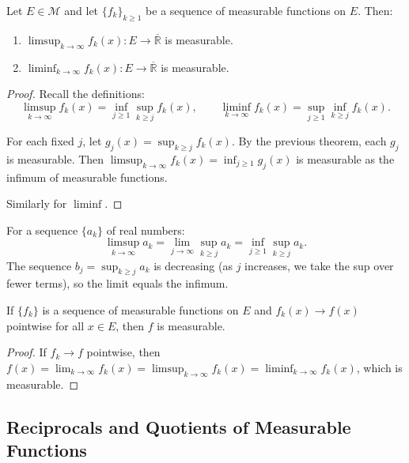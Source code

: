 \documentclass[11pt]{report}
\begin{document}
\begin{thmbox}
Let $E \in \mathcal{M}$ and let $\{f_k\}_{k \geq 1}$ be a sequence of measurable functions on $E$. Then:
\begin{enumerate}
    \item $\displaystyle\limsup_{k \to \infty} f_k(x): E \to \overline{\mathbb{R}}$ is measurable.
    \item $\displaystyle\liminf_{k \to \infty} f_k(x): E \to \overline{\mathbb{R}}$ is measurable.
\end{enumerate}
\end{thmbox}

\begin{proof}
Recall the definitions:
\[
\limsup_{k \to \infty} f_k(x) = \inf_{j \geq 1} \sup_{k \geq j} f_k(x), \qquad \liminf_{k \to \infty} f_k(x) = \sup_{j \geq 1} \inf_{k \geq j} f_k(x).
\]

For each fixed $j$, let $g_j(x) = \sup_{k \geq j} f_k(x)$. By the previous theorem, each $g_j$ is measurable. Then $\limsup_{k \to \infty} f_k(x) = \inf_{j \geq 1} g_j(x)$ is measurable as the infimum of measurable functions.

Similarly for $\liminf$.
\end{proof}

\begin{rembox}
For a sequence $\{a_k\}$ of real numbers:
\[
\limsup_{k \to \infty} a_k = \lim_{j \to \infty} \sup_{k \geq j} a_k = \inf_{j \geq 1} \sup_{k \geq j} a_k.
\]
The sequence $b_j = \sup_{k \geq j} a_k$ is decreasing (as $j$ increases, we take the sup over fewer terms), so the limit equals the infimum.
\end{rembox}

\begin{corbox}
If $\{f_k\}$ is a sequence of measurable functions on $E$ and $f_k(x) \to f(x)$ pointwise for all $x \in E$, then $f$ is measurable.
\end{corbox}

\begin{proof}
If $f_k \to f$ pointwise, then $f(x) = \lim_{k \to \infty} f_k(x) = \limsup_{k \to \infty} f_k(x) = \liminf_{k \to \infty} f_k(x)$, which is measurable.
\end{proof}

\subsection{Reciprocals and Quotients of Measurable Functions}
\end{document}
